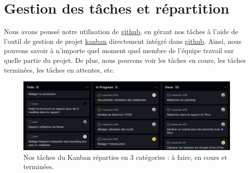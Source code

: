 \section{Gestion des tâches et répartition}
Nous avons poussé notre utilisation de \href{https://github.com}{github}, en gérant nos tâches à l'aide de l'outil de gestion de projet \href{https://github.com/topics/kanban}{kanban} directement intégré dans \href{https://github.com}{github}. Ainsi, nous pouvons savoir à n'importe quel moment quel membre de l'équipe travail sur quelle partie du projet. De plus, nous pouvons voir les tâches en cours, les tâches terminées, les tâches en attentes, etc. 

\begin{figure}[htb!]
    \centering
    \includegraphics[width=0.8\linewidth]{images/kanban.png}
    \caption{Nos tâches du Kanban réparties en 3 catégories : à faire, en cours et terminées.}
    \label{fig:kanban}
\end{figure}
